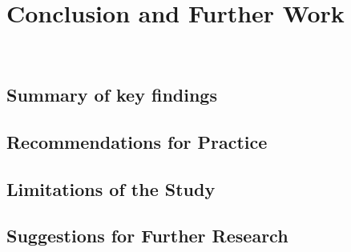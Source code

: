 \section{Conclusion and Further Work}
~\label{chap:conclusion}
\subsection{Summary of key findings}

\subsection{Recommendations for Practice}

\subsection{Limitations of the Study}

\subsection{Suggestions for Further Research}
